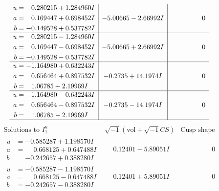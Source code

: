 \documentclass[1p]{elsarticle_modified}
\theoremstyle{definition}
\newcommand{\I}{\sqrt{-1}}
\begin{document}
$$\begin{array}{c|c|c}
\begin{aligned}
u &= \phantom{-}0.280215 + 1.284960 I \\
a &= \phantom{-}0.169447 + 0.698452 I \\
b &= -0.149528 + 0.537782 I\end{aligned}
 & -5.00665 - 2.66992 I & \phantom{-0.000000 } 0 \\ \hline\begin{aligned}
u &= \phantom{-}0.280215 - 1.284960 I \\
a &= \phantom{-}0.169447 - 0.698452 I \\
b &= -0.149528 - 0.537782 I\end{aligned}
 & -5.00665 + 2.66992 I & \phantom{-0.000000 } 0 \\ \hline\begin{aligned}
u &= -1.164980 + 0.632243 I \\
a &= \phantom{-}0.656464 + 0.897532 I \\
b &= \phantom{-}1.06785 + 2.19969 I\end{aligned}
 & -0.2735 + 14.1974 I & \phantom{-0.000000 } 0 \\ \hline\begin{aligned}
u &= -1.164980 - 0.632243 I \\
a &= \phantom{-}0.656464 - 0.897532 I \\
b &= \phantom{-}1.06785 - 2.19969 I\end{aligned}
 & -0.2735 - 14.1974 I & \phantom{-0.000000 } 0\\
 \hline 
 \end{array}$$\newpage$$\begin{array}{c|c|c}  
\text{Solutions to }I^u_{1}& \I (\text{vol} + \sqrt{-1}CS) & \text{Cusp shape}\\
 \hline 
\begin{aligned}
u &= -0.585287 + 1.198570 I \\
a &= \phantom{-}0.668125 + 0.647488 I \\
b &= -0.242657 + 0.388280 I\end{aligned}
 & \phantom{-}0.12401 - 5.89051 I & \phantom{-0.000000 } 0 \\ \hline\begin{aligned}
u &= -0.585287 - 1.198570 I \\
a &= \phantom{-}0.668125 - 0.647488 I \\
b &= -0.242657 - 0.388280 I\end{aligned}
 & \phantom{-}0.12401 + 5.89051 I & \phantom{-0.000000 } 0 \\ \hline\begin{aligned}

\end{aligned}
\end{array}$$
\end{document}

